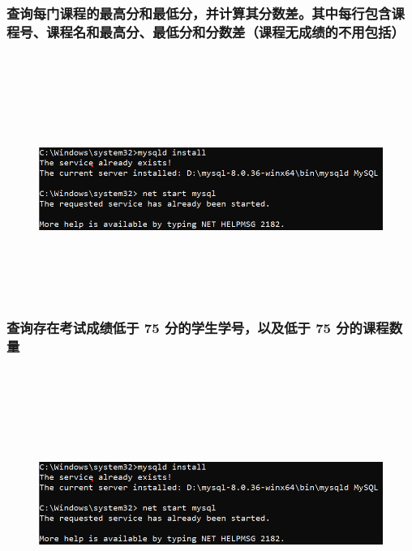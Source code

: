 \documentclass{ctexart}
\begin{document}
\subsubsection{查询每门课程的最高分和最低分，并计算其分数差。其中每行包含课程号、课程名和最高分、最低分和分数差（课程无成绩的不用包括）}
\begin{lstlisting}[language=sql]
	
\end{lstlisting}
\begin{figure}[H]
	\centering 
	\includegraphics[height=7cm,width=14cm]{1.png}
	\end{figure}
\subsubsection{查询存在考试成绩低于 75 分的学生学号，以及低于 75 分的课程数量}
\begin{lstlisting}[language=sql]
	
\end{lstlisting}
\begin{figure}[H]
	\centering 
	\includegraphics[height=7cm,width=14cm]{1.png}
	\end{figure}
\end{document}
